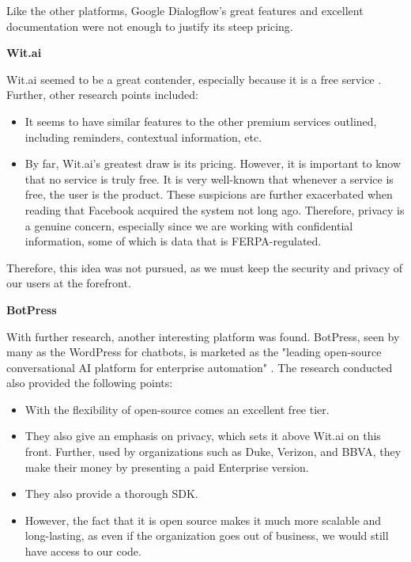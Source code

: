 \documentclass[titlepage, 12pt]{article}
\begin{document}
Like the other platforms, Google Dialogflow's great features and excellent documentation were not enough to justify its steep pricing.

\textbf{Wit.ai}

Wit.ai seemed to be a great contender, especially because it is a free service \cite{bib-2-18}. Further, other research points included:

\begin{itemize}
    \item It seems to have similar features to the other premium services outlined, including reminders, contextual information, etc.
    \item By far, Wit.ai's greatest draw is its pricing. However, it is important to know that no service is truly free. It is very well-known that whenever a service is free, the user is the product. These suspicions are further exacerbated when reading that Facebook acquired the system not long ago. Therefore, privacy is a genuine concern, especially since we are working with confidential information, some of which is data that is FERPA-regulated.
\end{itemize}

Therefore, this idea was not pursued, as we must keep the security and privacy of our users at the forefront.

\textbf{BotPress}

With further research, another interesting platform was found. BotPress, seen by many as the WordPress for chatbots, is marketed as the "leading open-source conversational AI platform for enterprise automation" \cite{bib-2-19}. The research conducted also provided the following points:

\begin{itemize}
    \item With the flexibility of open-source comes an excellent free tier.
    \item They also give an emphasis on privacy, which sets it above Wit.ai on this front. Further, used by organizations such as Duke, Verizon, and BBVA, they make their money by presenting a paid Enterprise version.
    \item They also provide a thorough SDK.
    \item However, the fact that it is open source makes it much more scalable and long-lasting, as even if the organization goes out of business, we would still have access to our code.
\end{itemize}
\end{document}
